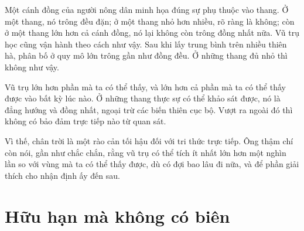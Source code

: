 Một cánh đồng của người nông dân minh họa đúng sự phụ thuộc vào thang. Ở một thang, nó trông đều đặn; ở một thang nhỏ hơn nhiều, rõ ràng là không; còn ở một thang lớn hơn cả cánh đồng, nó lại không còn trông đồng nhất nữa. Vũ trụ học cũng vận hành theo cách như vậy. Sau khi lấy trung bình trên nhiều thiên hà, phân bố ở quy mô lớn trông gần như đồng đều. Ở những thang đủ nhỏ thì không như vậy.

Vũ trụ lớn hơn phần mà ta có thể thấy, và lớn hơn cả phần mà ta có thể thấy được vào bất kỳ lúc nào. Ở những thang thực sự có thể khảo sát được, nó là đẳng hướng và đồng nhất, ngoại trừ các biến thiên cục bộ. Vượt ra ngoài đó thì không có bảo đảm trực tiếp nào từ quan sát.

\begin{classroomqa}
\end{classroomqa}

\begin{classroomqa}
\end{classroomqa}

Vì thế, chân trời là một rào cản tối hậu đối với tri thức trực tiếp. Ông thậm chí còn nói, gần như chắc chắn, rằng vũ trụ có thể tích ít nhất lớn hơn một nghìn lần so với vùng mà ta có thể thấy được, dù có đợi bao lâu đi nữa, và để phần giải thích cho nhận định ấy đến sau.

\section{Hữu hạn mà không có biên}

